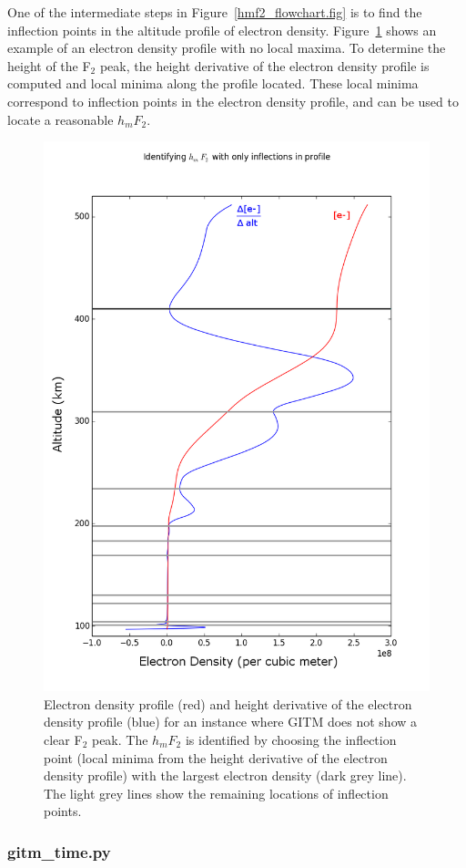 One of the intermediate steps in Figure~\ref{hmf2_flowchart.fig} is to find the inflection points in the altitude profile of electron density.  Figure~\ref{hmf2_profile.fig} shows an example of an electron density profile with no local maxima.  To determine the height of the F$_2$ peak, the height derivative of the electron density profile is computed and local minima along the profile located.  These local minima correspond to inflection points in the electron density profile, and can be used to locate a reasonable $h_mF_2$.

\begin{figure}
\begin{center}
\noindent\includegraphics[width=.6\textwidth]{Figures/determining_hmF2_saddle_profile.png}
\caption{Electron density profile (red) and height derivative of the electron density profile (blue) for an instance where GITM does not show a clear F$_2$ peak.  The $h_mF_2$ is identified by choosing the inflection point (local minima from the height derivative of the electron density profile) with the largest electron density (dark grey line).  The light grey lines show the remaining locations of inflection points.}
\label{gitm_3D_global_plots.fig}
\end{center}
\label{hmf2_profile.fig}
\end{figure}

\subsubsection{gitm\_time.py}

